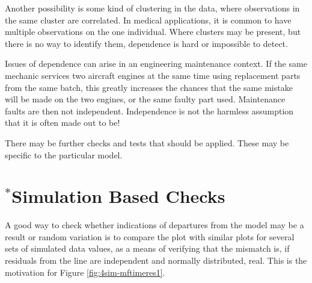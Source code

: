  Another possibility is some kind of clustering in the data, where
 observations in the same cluster are correlated. In medical
 applications, it is common to have multiple observations on the one
 individual.   Where clusters may be present, but there is no way to
 identify them, dependence is hard or impossible to detect.

 Issues of dependence can arise in an engineering maintenance context.
 If the same mechanic services two aircraft engines at the same time
 using replacement parts from the same batch, this greatly increases
 the chances that the same mistake will be made on the two engines, or
 the same faulty part used.  Maintenance faults are then not
 independent. Independence is not the harmless assumption that it is
 often made out to be!

There may be further checks and tests that should be applied.
These may be specific to the particular model.

\section{$^*$Simulation Based Checks}\label{sec:simcheck}

A good way to check whether indications of departures from the model
may be a result or random variation is to compare the plot with
similar plots for several sets of simulated data values, as a means
of verifying that the mismatch is, if residuals from the line are
independent and normally distributed, real. This is the motivation
for Figure \ref{fig:4sim-mftimeres1}. 
  

